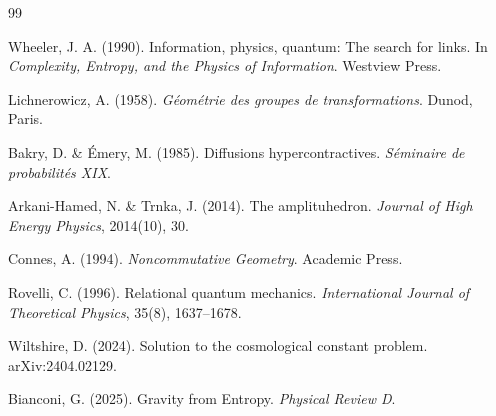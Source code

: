 \documentclass[11pt,a4paper]{article}
\theoremstyle{definition}
\theoremstyle{remark}
\begin{document}
\begin{thebibliography}{99}

 Wheeler, J. A. (1990). Information, physics, quantum: The search for links. In \textit{Complexity, Entropy, and the Physics of Information}. Westview Press.

 Lichnerowicz, A. (1958). \textit{G\'eom\'etrie des groupes de transformations}. Dunod, Paris.

 Bakry, D. \& \'Emery, M. (1985). Diffusions hypercontractives. \textit{S\'eminaire de probabilit\'es XIX}.

 Arkani-Hamed, N. \& Trnka, J. (2014). The amplituhedron. \textit{Journal of High Energy Physics}, 2014(10), 30.

 Connes, A. (1994). \textit{Noncommutative Geometry}. Academic Press.

 Rovelli, C. (1996). Relational quantum mechanics. \textit{International Journal of Theoretical Physics}, 35(8), 1637--1678.

 Wiltshire, D. (2024). Solution to the cosmological constant problem. arXiv:2404.02129.

 Bianconi, G. (2025). Gravity from Entropy. \textit{Physical Review D}.

\end{thebibliography}
\end{document}
